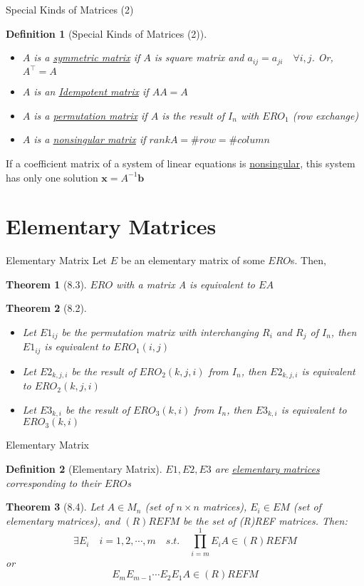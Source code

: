 \documentclass[a4paper,11pt]{article}
\newtheorem{defn}{Definition}
\newtheorem{thm}{Theorem}
\begin{document}
\begin{frame}[t]{Special Kinds of Matrices (2)}
	\begin{defn}
		[Special Kinds of Matrices (2)]
		\begin{itemize}
			\item $A$ is a \uline{symmetric matrix} if $A$ is square matrix and $a_{ij}=a_{ji}\quad\forall i,j$. Or, $A^\intercal = A$
			\item $A$ is an \uline{Idempotent matrix} if $AA=A$
			\item $A$ is a \uline{permutation matrix} if $A$ is the result of $I_n$ with $ERO_1$ (row exchange)
			\item $A$ is a \uline{nonsingular matrix} if $rank A = \# row = \# column$
		\end{itemize}
	\end{defn}
	If a coefficient matrix of a system of linear equations is \uline{nonsingular}, this system has only one solution $\mathbf{x} = A^{-1}\mathbf{b}$
\end{frame}

\section{Elementary Matrices} %
\label{sec:elementary_matrices}
\begin{frame}[t]{Elementary Matrix}
	Let $E$ be an elementary matrix of some $ERO$s. Then, 
	\begin{thm}
		[8.3] $ERO$ with a matrix A is equivalent to $EA$
	\end{thm}
	\begin{thm}
		[8.2] \begin{itemize}
			\item Let $E1_{ij}$ be the permutation matrix with interchanging $R_i$ and $R_j$ of $I_n$, then $E1_{ij}$ is equivalent to $ERO_1(i,j)$
			\item Let $E2_{k,j,i}$ be the result of $ERO_2(k,j,i)$ from $I_n$, then $E2_{k,j,i}$ is equivalent to $ERO_2(k,j,i)$
			\item Let $E3_{k,i}$ be the result of $ERO_3(k,i)$ from $I_n$, then $E3_{k,i}$ is equivalent to $ERO_3(k,i)$
		\end{itemize}
	\end{thm}
\end{frame}
\begin{frame}[t]{Elementary Matrix}
	\begin{defn}
		[Elementary Matrix]
		$E1,E2,E3$ are \uline{elementary matrices} corresponding to their $ERO$s
	\end{defn}
	\begin{thm}
		[8.4] Let $A\in M_n$ (set of $n\times n$ matrices), $E_i\in EM$ (set of elementary matrices), and $(R)REFM$ be the set of (R)REF matrices. Then: \[
			\exists E_i\quad i=1,2,\cdots,m\quad s.t.\quad \prod_{i=m}^1E_i A \in (R)REFM
		\] or \[
			E_m E_{m-1}\cdots E_2E_1 A \in (R)REFM
		\]
	\end{thm}
\end{frame}
\end{document}
